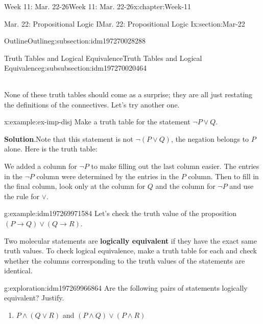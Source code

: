 \documentclass[oneside,10pt,]{book}
\newcommand{\blocktitlefont}{\relax}
\newcommand{\tabularfont}{\relax}
\newcommand{\terminology}[1]{\textbf{#1}}
\numberwithin{equation}{section}
\newcommand{\hrulethin}  {\noalign{\hrule height 0.04em}}
\begin{document}
\begin{chapterptx}{Week 11: Mar. 22-26}{}{Week 11: Mar. 22-26}{}{}{x:chapter:Week-11}
\begin{sectionptx}{Mar. 22: Propositional Logic I}{}{Mar. 22: Propositional Logic I}{}{}{x:section:Mar-22}
\begin{subsectionptx}{Outline}{}{Outline}{}{}{g:subsection:idm197270028288}
\begin{subsubsectionptx}{Truth Tables and Logical Equivalence}{}{Truth Tables and Logical Equivalence}{}{}{g:subsubsection:idm197270020464}
\begin{sidebyside}{1}{0}{0}{0}
\begin{sbspanel}{1}
{{{\begin{tabular}{cBc}
\end{tabular}
}%
\par}
}%
\end{sbspanel}%
\end{sidebyside}%
\par
None of these truth tables should come as a surprise; they are all just restating the definitions of the connectives. Let's try another one.%
\begin{example}{}{x:example:ex-imp-disj}%
Make a truth table for the statement \(\neg P \vee Q\).%
\par\smallskip%
\noindent\textbf{\blocktitlefont Solution}.\hypertarget{p:solution:QRL}{}\quad{}Note that this statement is not \(\neg(P \vee Q)\), the negation belongs to \(P\) alone. Here is the truth table:%
\begin{sidebyside}{1}{0}{0}{0}%
\begin{sbspanel}{1}%
\resizebox{\linewidth}{!}{%
{\centering%
{\tabularfont%
\begin{tabular}{cAcBcAc}
\(P\)&\(Q\)&\(\neg P\)&\(\neg P \vee Q\)\tabularnewline\hrulethin
T&T&F&T\tabularnewline[0pt]
T&F&F&F\tabularnewline[0pt]
F&T&T&T\tabularnewline[0pt]
F&F&T&T
\end{tabular}
}%
\par}
}%
\end{sbspanel}%
\end{sidebyside}%
\par
We added a column for \(\neg P\) to make filling out the last column easier. The entries in the \(\neg P\) column were determined by the entries in the \(P\) column. Then to fill in the final column, look only at the column for \(Q\) and the column for \(\neg P\) and use the rule for \(\vee\).%
\end{example}
\begin{example}{}{g:example:idm197269971584}%
Let's check the truth value of the proposition \((P\to Q) \lor (Q\to R)\).%
\end{example}
Two molecular statements are \terminology{logically equivalent} if they have the exact same truth values. To check logical equivalence, make a truth table for each and check whether the columns corresponding to the truth values of the statements are identical.%
\begin{exploration}{}{g:exploration:idm197269966864}%
Are the following pairs of statements logically equivalent? Justify.%
%
\begin{enumerate}
\item{}\(P\land (Q\lor R)\) and \((P\land Q) \lor (P\land R)\)%

\end{enumerate}
\end{exploration}
\end{subsubsectionptx}
\end{subsectionptx}
\end{sectionptx}
\end{chapterptx}
\end{document}
